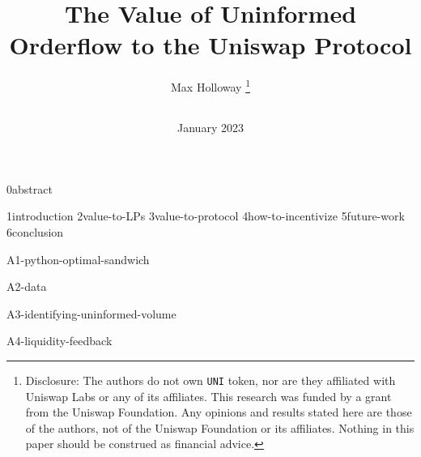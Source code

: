 \documentclass{article}
\title{The Value of Uninformed Orderflow to the Uniswap Protocol}
\author{
    Max Holloway \footnote{Disclosure: The authors do not own \texttt{UNI} token, nor are they affiliated with Uniswap Labs or any of its affiliates. This research was funded by a grant from the Uniswap Foundation. Any opinions and results stated here are those of the authors, not of the Uniswap Foundation or its affiliates. Nothing in this paper should be construed as financial advice.} \\
    \texttt{
        \href{mailto:max@xenophonlabs.com}{\color{black}{max@xenophonlabs.com}}
    } 
}
\date{January 2023}
\begin{document}
    \maketitle    
    {0abstract}
    \tableofcontents
    \newpage
    
    {1introduction}
    {2value-to-LPs}
    {3value-to-protocol}
    {4how-to-incentivize}
    {5future-work}
    {6conclusion}
    
    \appendix
    \newpage
    {A1-python-optimal-sandwich}
    
    \newpage
    {A2-data}
    
    \newpage
    {A3-identifying-uninformed-volume}

    \newpage
    {A4-liquidity-feedback}

    \newpage
    \printbibliography
    
\end{document}
